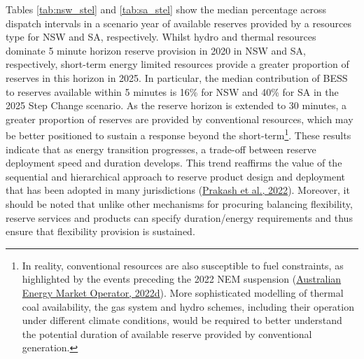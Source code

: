 \documentclass[12pt,a4paper,]{report}
\begin{document}
Tables \ref{tab:nsw_stel} and \ref{tab:sa_stel} show the median
percentage across dispatch intervals in a scenario year of available
reserves provided by a resources type for NSW and SA, respectively.
Whilst hydro and thermal resources dominate 5 minute horizon reserve
provision in 2020 in NSW and SA, respectively, short-term energy limited
resources provide a greater proportion of reserves in this horizon in
2025. In particular, the median contribution of BESS to reserves
available within 5 minutes is 16\% for NSW and 40\% for SA in the 2025
Step Change scenario. As the reserve horizon is extended to 30 minutes,
a greater proportion of reserves are provided by conventional resources,
which may be better positioned to sustain a response beyond the
short-term\footnote{In reality, conventional resources are also
  susceptible to fuel constraints, as highlighted by the events
  preceding the 2022 NEM suspension
  (\protect\hyperlink{ref-australianenergymarketoperatorNEMMarketSuspension2022}{Australian
  Energy Market Operator, 2022d}). More sophisticated modelling of
  thermal coal availability, the gas system and hydro schemes, including
  their operation under different climate conditions, would be required
  to better understand the potential duration of available reserve
  provided by conventional generation.}. These results indicate that as
energy transition progresses, a trade-off between reserve deployment
speed and duration develops. This trend reaffirms the value of the
sequential and hierarchical approach to reserve product design and
deployment that has been adopted in many jurisdictions
(\protect\hyperlink{ref-prakashInsightsDesigningEffective2022}{Prakash
et al., 2022}). Moreover, it should be noted that unlike other
mechanisms for procuring balancing flexibility, reserve services and
products can specify duration/energy requirements and thus ensure that
flexibility provision is sustained.
\end{document}
